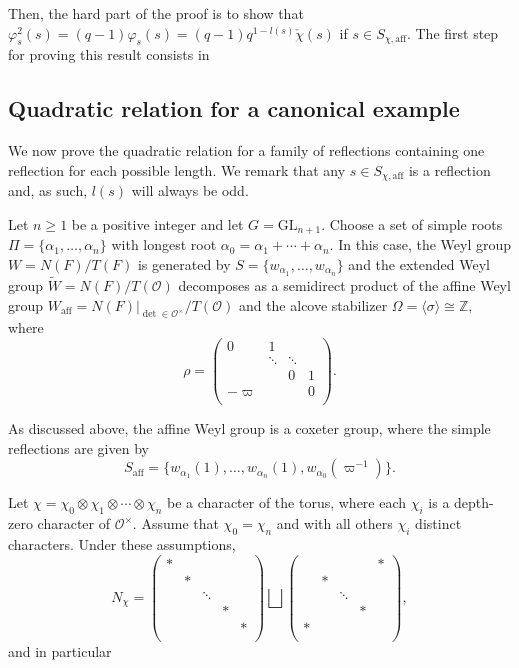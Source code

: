 \documentclass{article}
\newcommand{\aff}{\mathrm{aff}}
\newcommand{\cO}{\mathcal{O}}
\newcommand{\ZZ}{\mathbb{Z}}
\theoremstyle{plain}
\theoremstyle{definition}
\begin{document}
    Then, the hard part of the proof is to show that $\varphi_s^2(s)=(q-1)\varphi_s(s)=(q-1)q^{1-l(s)}\check{\chi}(s)$ if $s\in S_{\chi,\aff}$.
    The first step for proving this result consists in 

    \subsection{Quadratic relation for a canonical example}
    We now prove the quadratic relation for a family of reflections containing one reflection for each possible length. We remark that any $s\in S_{\chi,\aff}$ is a reflection and, as such, $l(s)$ will always be odd.

    Let $n\geq1$ be a positive integer and let $G=\mathrm{GL}_{n+1}$. Choose a set of simple roots $\Pi=\{\alpha_1,\ldots,\alpha_n\}$ with longest root $\alpha_0=\alpha_1+\cdots+\alpha_n$. In this case, the Weyl group $W=N(F)/T(F)$ is generated by $S=\{w_{\alpha_1},\ldots,w_{\alpha_n}\}$ and the extended Weyl group $\tilde{W}=N(F)/T(\cO)$ decomposes as a semidirect product of the affine Weyl group $W_{\aff}=N(F)|_{\det\in\cO^\times}/T(\cO)$ and the alcove stabilizer $\Omega=\langle\sigma\rangle\cong\ZZ,$ where
    $$\rho=\begin{pmatrix}
        0&1&&\\
        &\ddots&\ddots&\\
        &&0&1\\
        -\varpi &&&0\\
    \end{pmatrix}.$$

    As discussed above, the affine Weyl group is a coxeter group, where the simple reflections are given by 
    $$S_{\aff}=\{w_{\alpha_1}(1),\ldots,w_{\alpha_n}(1),w_{\alpha_0}(\varpi^{-1})\}.$$

    Let $\chi=\chi_0\otimes\chi_1\otimes\cdots\otimes\chi_n$ be a character of the torus, where each $\chi_i$ is a depth-zero character of $\cO^\times$. Assume that $\chi_0=\chi_n$ and with all others $\chi_i$ distinct characters. Under these assumptions, 
    $$N_\chi=\begin{pmatrix}
        *&&&&\\
        &*&&&\\
        &&\ddots&&\\
        &&&*&\\
        &&&&*\\
    \end{pmatrix}\bigsqcup\begin{pmatrix}
        &&&&*\\
        &*&&&\\
        &&\ddots&&\\
        &&&*&\\
        *&&&&\\
    \end{pmatrix},$$
    and in particular
\end{document}
